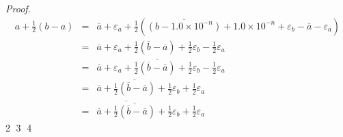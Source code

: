 \documentclass[14pt]{jsarticle}
\theoremstyle{definition}
\begin{document}
\begin{proof}
\begin{eqnarray}
a + \frac{1}{2}(b - a) &=& \overline a + \varepsilon_a 
                         + \frac{1}{2}(\overline{(b-1.0\times10^{-n})} + 1.0\times10^{-n} + \varepsilon_b - \overline a - \varepsilon_a) \\
                       &=& \overline a + \varepsilon_a
                         + \frac{1}{2}(\overline b - \overline a) + \frac{1}{2}\varepsilon_b - \frac{1}{2}\varepsilon_a \\
		       &=& \overline a + \varepsilon_a
                         + \frac{1}{2}\overline{(\overline b - \overline a)} 
                         + \frac{1}{2}\varepsilon_b - \frac{1}{2}\varepsilon_a \\
                       &=& \overline a 
                         + \overline{\frac{1}{2}(\overline b - \overline a)} 
                         + \frac{1}{2}\varepsilon_b + \frac{1}{2}\varepsilon_a \\
		       &=& \overline{\overline a 
                         + \overline{\frac{1}{2}(\overline b - \overline a)}}
                         + \frac{1}{2}\varepsilon_b + \frac{1}{2}\varepsilon_a
\end{eqnarray}
\textcircled{\scriptsize 2}
\textcircled{\scriptsize 3}
\textcircled{\scriptsize 4}
\end{proof}
\end{document}
